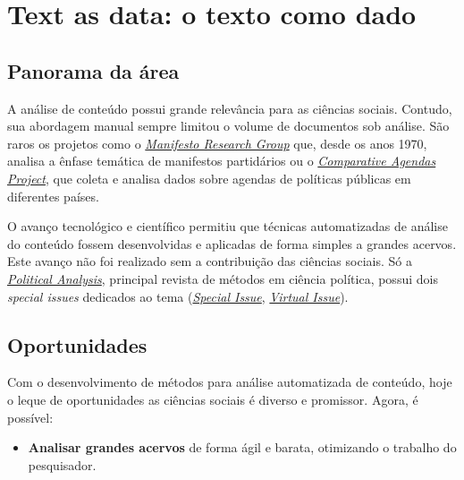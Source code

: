 \documentclass[]{book}
\providecommand{\tightlist}{%
  \setlength{\itemsep}{0pt}\setlength{\parskip}{0pt}}
\begin{document}
\hypertarget{tada}{%
\chapter{Text as data: o texto como dado}\label{tada}}

\hypertarget{panorama-da-uxe1rea}{%
\section{Panorama da área}\label{panorama-da-uxe1rea}}

A análise de conteúdo possui grande relevância para as ciências sociais. Contudo, sua abordagem manual sempre limitou o volume de documentos sob análise. São raros os projetos como o \href{https://manifestoproject.wzb.eu/}{\emph{Manifesto Research Group}} que, desde os anos 1970, analisa a ênfase temática de manifestos partidários ou o \href{http://www.comparativeagendas.net/}{\emph{Comparative Agendas Project}}, que coleta e analisa dados sobre agendas de políticas públicas em diferentes países.

O avanço tecnológico e científico permitiu que técnicas automatizadas de análise do conteúdo fossem desenvolvidas e aplicadas de forma simples a grandes acervos. Este avanço não foi realizado sem a contribuição das ciências sociais. Só a \href{https://www.cambridge.org/core/journals/political-analysis}{\emph{Political Analysis}}, principal revista de métodos em ciência política, possui dois \emph{special issues} dedicados ao tema (\href{https://www.cambridge.org/core/journals/political-analysis/article/introduction-to-the-special-issue-the-statistical-analysis-of-political-text/E3D4575845083A506B2177F3F1152100}{\emph{Special Issue}}, \href{https://www.cambridge.org/core/journals/political-analysis/issue/FF88EF06ABD5D421202E8284F67DE2F7}{\emph{Virtual Issue}}).

\hypertarget{oportunidades}{%
\section{Oportunidades}\label{oportunidades}}

Com o desenvolvimento de métodos para análise automatizada de conteúdo, hoje o leque de oportunidades as ciências sociais é diverso e promissor. Agora, é possível:

\begin{itemize}
\tightlist
\item
  \textbf{Analisar grandes acervos} de forma ágil e barata, otimizando o trabalho do pesquisador.
\end{itemize}
\end{document}
